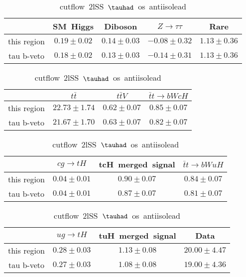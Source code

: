\begin{table}
\caption{cutflow~2lSS~$\tauhad$~os~antiisolead}
\centering
\begin{tabular}{|c|c|c|c|c|} \hline
 & SM~Higgs & Diboson & $Z\to \tau\tau$ & Rare\\\hline
this region & $0.19\pm0.02$ & $0.14\pm0.03$ & $-0.08\pm0.32$ & $1.13\pm0.36$\\\hline
tau b-veto & $0.18\pm0.02$ & $0.13\pm0.03$ & $-0.14\pm0.31$ & $1.13\pm0.36$\\\hline
\end{tabular}
\begin{tabular}{|c|c|c|c|} \hline
 & $t\bar{t}$ & $t\bar{t}V$ & $\bar{t}t\to bWcH$\\\hline
this region & $22.73\pm1.74$ & $0.62\pm0.07$ & $0.85\pm0.07$\\\hline
tau b-veto & $21.67\pm1.70$ & $0.63\pm0.07$ & $0.82\pm0.07$\\\hline
\end{tabular}
\begin{tabular}{|c|c|c|c|} \hline
 & $cg\to tH$ & tcH~merged~signal & $\bar{t}t\to bWuH$\\\hline
this region & $0.04\pm0.01$ & $0.90\pm0.07$ & $0.84\pm0.07$\\\hline
tau b-veto & $0.04\pm0.01$ & $0.87\pm0.07$ & $0.81\pm0.07$\\\hline
\end{tabular}
\begin{tabular}{|c|c|c|c|} \hline
 & $ug\to tH$ & tuH~merged~signal & Data\\\hline
this region & $0.28\pm0.03$ & $1.13\pm0.08$ & $20.00\pm4.47$\\\hline
tau b-veto & $0.27\pm0.03$ & $1.08\pm0.08$ & $19.00\pm4.36$\\\hline
\end{tabular}
\label{tab:cutflow_reg2lSS1tau1bnj_os_antiisolead}
\end{table}
